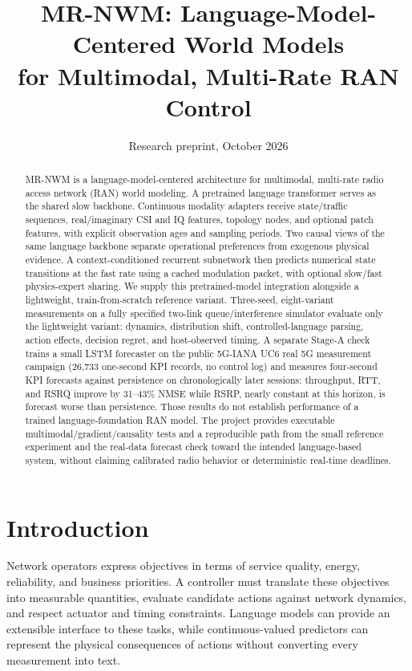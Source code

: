 \documentclass[10pt,twocolumn]{article}
\title{\vspace{-1.4em}MR-NWM: Language-Model-Centered World Models\\for Multimodal, Multi-Rate RAN Control}
\author{}
\date{Research preprint, October 2026}
\begin{document}
\maketitle
\begin{abstract}
MR-NWM is a language-model-centered architecture for multimodal, multi-rate
radio access network (RAN) world modeling. A pretrained language transformer
serves as the shared slow backbone. Continuous modality adapters receive
state/traffic sequences, real/imaginary CSI and IQ features, topology nodes,
and optional patch features, with explicit observation ages and sampling
periods. Two causal views of the same language backbone separate operational
preferences from exogenous physical evidence. A context-conditioned recurrent
subnetwork then predicts numerical state transitions at the fast rate using a
cached modulation packet, with optional slow/fast physics-expert sharing.
We supply this pretrained-model integration alongside a lightweight,
train-from-scratch reference variant. Three-seed, eight-variant measurements on
a fully specified two-link queue/interference simulator evaluate only the
lightweight variant: dynamics, distribution shift, controlled-language parsing,
action effects, decision regret, and host-observed timing. A separate Stage-A
check trains a small LSTM forecaster on the public 5G-IANA UC6 real 5G
measurement campaign (26{,}733 one-second KPI records, no control log) and
measures four-second KPI forecasts against persistence on chronologically
later sessions: throughput, RTT, and RSRQ improve by 31--43\% NMSE while RSRP,
nearly constant at this horizon, is forecast worse than persistence. Those
results do not establish performance of a trained language-foundation RAN
model. The project provides executable multimodal/gradient/causality tests and
a reproducible path from the small reference experiment and the real-data
forecast check toward the intended language-based system, without claiming
calibrated radio behavior or deterministic real-time deadlines.
\end{abstract}

\section{Introduction}
Network operators express objectives in terms of service quality, energy,
reliability, and business priorities. A controller must translate these
objectives into measurable quantities, evaluate candidate actions against
network dynamics, and respect actuator and timing constraints. Language models
can provide an extensible interface to these tasks, while continuous-valued
predictors can represent the physical consequences of actions without
converting every measurement into text.
\end{document}
